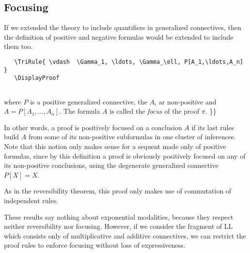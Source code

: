 \subsection{Focusing}\label{focusing}

If we extended the theory to include quantifiers in generalized
connectives, then the definition of positive and negative formulas would
be extended to include them too.

\texttt{~~~\textbackslash{}TriRule\{~\textbackslash{}vdash~~\textbackslash{}Gamma\_1,~\textbackslash{}ldots,~\textbackslash{}Gamma\_\textbackslash{}ell,~P{[}A\_1,\textbackslash{}ldots,A\_n{]}~\}}\\
\texttt{~~~\textbackslash{}DisplayProof}\\
\texttt{~}

where \(P\) is a positive generalized connective, the \(A_i\) ar
non-positive and \(A=P[A_1,\ldots,A_n]\). The formula \(A\) is called
the \emph{focus} of the proof \(\pi\). \}\}

In other words, a proof is positively focused on a conclusion \(A\) if
its last rules build \(A\) from some of its non-positive subformulas in
one cluster of inferences. Note that this notion only makes sense for a
sequent made only of positive formulas, since by this definition a proof
is obviously positively focused on any of its non-positive conclusions,
using the degenerate generalized connective \(P[X]=X\).

As in the reversibility theorem, this proof only makes use of
commutation of independent rules.

These results say nothing about exponential modalities, because they
respect neither reversibility nor focusing. However, if we consider
the fragment of LL which consists only of multiplicative and additive
connectives, we can restrict the proof rules to enforce focusing
without loss of expressiveness.


